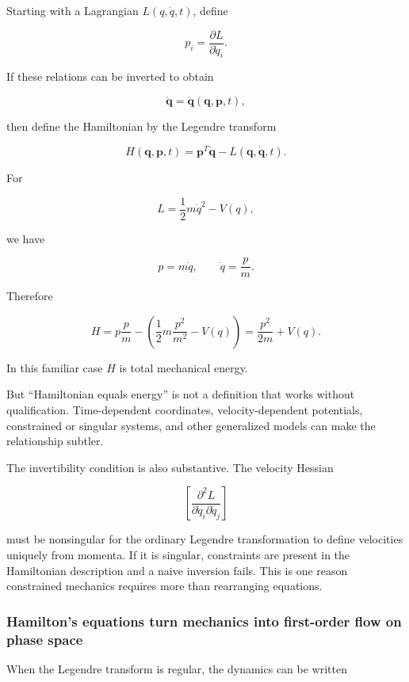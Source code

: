 Starting with a Lagrangian \(L(q,\dot q,t)\), define

\[
p_i=\frac{\partial L}{\partial\dot q_i}.
\]

If these relations can be inverted to obtain

\[
\dot{\mathbf q}
=
\dot{\mathbf q}(\mathbf q,\mathbf p,t),
\]

then define the Hamiltonian by the Legendre transform

\[
\boxed{
H(\mathbf q,\mathbf p,t)
=
\mathbf p^T\dot{\mathbf q}
-
L(\mathbf q,\dot{\mathbf q},t)
}.
\]

For

\[
L=\frac12m\dot q^2-V(q),
\]

we have

\[
p=m\dot q,
\qquad
\dot q=\frac pm.
\]

Therefore

\[
H
=
p\frac pm
-
\left(
\frac12m\frac{p^2}{m^2}
-
V(q)
\right)
=
\boxed{
\frac{p^2}{2m}+V(q)
}.
\]

In this familiar case \(H\) is total mechanical energy.

But ``Hamiltonian equals energy'' is not a definition that works without qualification. Time-dependent coordinates, velocity-dependent potentials, constrained or singular systems, and other generalized models can make the relationship subtler.

The invertibility condition is also substantive. The velocity Hessian

\[
\left[
\frac{\partial^2L}
{\partial\dot q_i\partial\dot q_j}
\right]
\]

must be nonsingular for the ordinary Legendre transformation to define velocities uniquely from momenta. If it is singular, constraints are present in the Hamiltonian description and a naive inversion fails. This is one reason constrained mechanics requires more than rearranging equations.

\subsubsection{Hamilton's equations turn mechanics into first-order flow on phase space}\label{02-foundations-ii-ch025-hamiltons-equations-turn-mechanics-into-first-order-flow-on-phase-space}

\hypertarget{02-foundations-ii-ch025-hamiltons-equations-turn-mechanics-into-first-order-flow-on-phase-space}{}

When the Legendre transform is regular, the dynamics can be written

